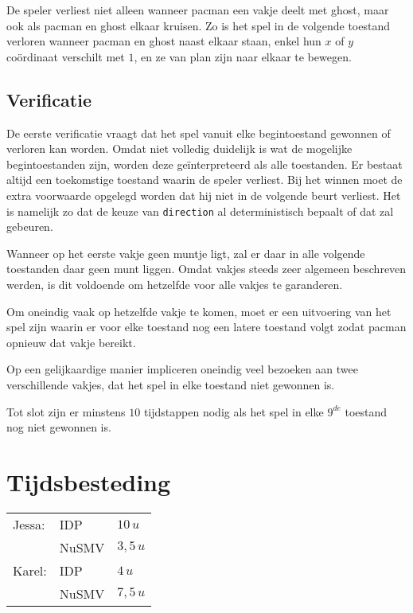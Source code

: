 \documentclass[a4paper,12pt]{article}
\begin{document}
De speler verliest niet alleen wanneer pacman een vakje deelt met ghost,
maar ook als pacman en ghost elkaar kruisen.
Zo is het spel in de volgende toestand verloren wanneer pacman en ghost naast elkaar staan,
enkel hun $ x $ of $ y $ co\"ordinaat verschilt met $ 1 $, en ze van plan zijn naar elkaar te bewegen.

\subsection{Verificatie}
De eerste verificatie vraagt dat het spel vanuit elke begintoestand gewonnen of verloren kan worden.
Omdat niet volledig duidelijk is wat de mogelijke begintoestanden zijn,
worden deze ge\"interpreteerd als alle toestanden.
Er bestaat altijd een toekomstige toestand waarin de speler verliest.
Bij het winnen moet de extra voorwaarde opgelegd worden dat hij niet in de volgende beurt verliest.
Het is namelijk zo dat de keuze van \texttt{direction} al deterministisch bepaalt of dat zal gebeuren.

Wanneer op het eerste vakje geen muntje ligt, zal er daar in alle volgende toestanden daar geen munt liggen.
Omdat vakjes steeds zeer algemeen beschreven werden, is dit voldoende om hetzelfde voor alle vakjes te garanderen.

Om oneindig vaak op hetzelfde vakje te komen,
moet er een uitvoering van het spel zijn waarin er voor elke toestand nog een latere toestand volgt 
zodat pacman opnieuw dat vakje bereikt.

Op een gelijkaardige manier impliceren oneindig veel bezoeken aan twee verschillende vakjes,
dat het spel in elke toestand niet gewonnen is.

Tot slot zijn er minstens $ 10 $ tijdstappen nodig als het spel in elke $ 9^{de} $ toestand nog niet gewonnen is.

\section{Tijdsbesteding}
\begin{tabular}{l l l}
Jessa: 	& IDP 	& $ 10\,u $\\
		& NuSMV 	& $ 3,5\,u $\\
Karel: 	& IDP 	& $ 4\,u $\\
		& NuSMV 	& $ 7,5\,u $\\
\end{tabular}

\end{document}
